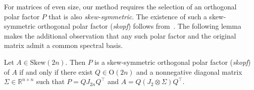 \documentclass[final,onefignum,onetabnum,dvipsnames]{siamart251216}
\numberwithin{algorithm}{section}
\numberwithin{equation}{section}
\begin{document}
For matrices of even size, our method requires the selection of an orthogonal polar factor $P$ that is also \emph{skew-symmetric}.
The existence of such a skew-symmetric orthogonal polar factor (\emph{skopf}) follows from~\cite[Thm~5.4]{MR2208338}. The following lemma makes the additional observation that any such polar factor and the original matrix admit a common spectral basis.
\begin{lemma}\label{lem:polar_decomposition}
     Let $A\in\mathrm{Skew}(2n)$. Then $P$ is a skew-symmetric orthogonal polar factor (\emph{skopf}) of $A$ if and only if there exist $Q\in\mathrm{O}(2n)$ and a nonnegative diagonal matrix $\Sigma \in \mathbb R^{n \times n}$ such that $P = QJ_{2n}Q^\top$ and $A = Q(J_2 \otimes \Sigma)Q^\top$.%
\end{lemma}
\end{document}
